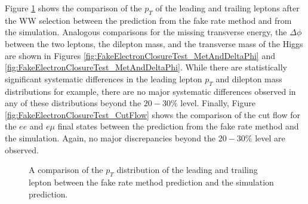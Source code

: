 Figure \ref{fig:FakeElectronClosureTest_LeptonPt} shows the comparison of the $p_{T}$
of the leading and trailing leptons after the WW selection between the prediction
from the fake rate method and from the simulation. Analogous comparisons for 
the missing transverse energy, the $\Delta\phi$ between the two leptons, 
the dilepton mass, and the transverse mass of the Higgs are shown in 
Figures \ref{fig:FakeElectronClosureTest_MetAndDeltaPhi} and 
\ref{fig:FakeElectronClosureTest_MetAndDeltaPhi}. While there are statistically 
significant systematic differences in the leading lepton $p_{T}$ and dilepton
mass distributions for example, there are no major systematic differences 
observed in any of these distributions beyond the $20-30\%$ level. Finally, 
Figure \ref{fig:FakeElectronClosureTest_CutFlow} shows the comparison of the 
cut flow for the $ee$ and $e\mu$ final states between
the prediction from the fake rate method and the simulation. Again, no major 
discrepancies beyond the $20-30\%$ level are observed. 


\begin{figure}[!htbp]
\begin{center}
\caption{A comparison of the $p_{T}$ distribution of the leading and trailing lepton
between the fake rate method prediction and the simulation prediction. }
\label{fig:FakeElectronClosureTest_LeptonPt}
\end{center}
\end{figure}

